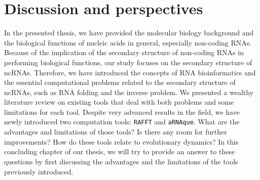 \chapter{Discussion and perspectives}\label{ch:continuity}

In the presented thesis, we have provided the molecular biology background and the biological functions of nucleic acids in general, especially non-coding RNAs. Because of the implication of the secondary structure of non-coding RNAs in performing biological functions, our study focuses on the secondary structure of ncRNAs. Therefore, we have introduced the concepts of RNA bioinformatics and the essential computational problems related to the secondary structure of ncRNAs, such as RNA folding and the inverse problem. We presented a wealthy literature review on existing tools that deal with both problems and some limitations for each tool. Despite very advanced results in the field, we have newly introduced two computation tools: \texttt{RAFFT} and \texttt{aRNAque}. What are the advantages and limitations of those tools? Is there any room for further improvements? How do these tools relate to evolutionary dynamics? In this concluding chapter of our thesis, we will try to provide an answer to these questions by first discussing the advantages and the limitations of the tools previously introduced. 

